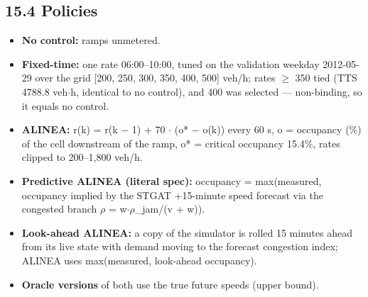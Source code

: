 \documentclass[10pt,a4paper]{article}
\begin{document}
\subsection*{15.4 Policies}
\begin{itemize}[nosep,leftmargin=*]
\item \textbf{No control:} ramps unmetered.
\item \textbf{Fixed-time:} one rate 06:00--10:00, tuned on the validation weekday 2012-05-29 over the grid [200, 250, 300, 350, 400, 500] veh/\allowbreak{}h; rates \ensuremath{\geq} 350 tied (TTS 4788.8 veh\ensuremath{\cdot}h, identical to no control), and 400 was selected --- non-binding, so it equals no control.
\item \textbf{ALINEA:} r(k) = r(k \ensuremath{-} 1) + 70 \ensuremath{\cdot} (o* \ensuremath{-} o(k)) every 60 s, o = occupancy (\%) of the cell downstream of the ramp, o* = critical occupancy 15.4\%, rates clipped to 200--1,800 veh/\allowbreak{}h.
\item \textbf{Predictive ALINEA (literal spec):} occupancy = max(measured, occupancy implied by the STGAT +15-minute speed forecast via the congested branch \ensuremath{\rho} = w\ensuremath{\cdot}\ensuremath{\rho}\_\allowbreak{}jam/\allowbreak{}(v + w)).
\item \textbf{Look-ahead ALINEA:} a copy of the simulator is rolled 15 minutes ahead from its live state with demand moving to the forecast congestion index; ALINEA uses max(measured, look-ahead occupancy).
\item \textbf{Oracle versions} of both use the true future speeds (upper bound).
\end{itemize}
\end{document}
